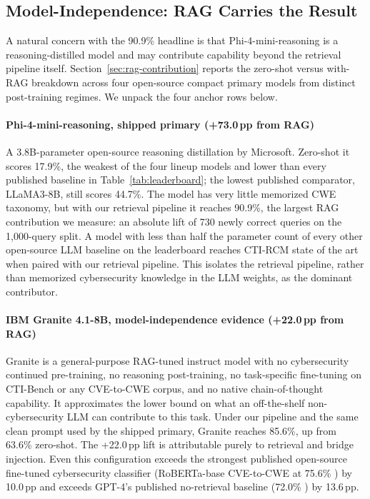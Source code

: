 \subsection{Model-Independence: RAG Carries the Result}
\label{sec:model-independence}

A natural concern with the 90.9\% headline is that Phi-4-mini-reasoning is a reasoning-distilled model and may contribute capability beyond the retrieval pipeline itself. Section~\ref{sec:rag-contribution} reports the zero-shot versus with-RAG breakdown across four open-source compact primary models from distinct post-training regimes. We unpack the four anchor rows below.

\paragraph{Phi-4-mini-reasoning, shipped primary (+73.0\,pp from RAG)} A 3.8B-parameter open-source reasoning distillation by Microsoft. Zero-shot it scores 17.9\%, the weakest of the four lineup models and lower than every published baseline in Table~\ref{tab:leaderboard}; the lowest published comparator, LLaMA3-8B, still scores 44.7\%. The model has very little memorized CWE taxonomy, but with our retrieval pipeline it reaches 90.9\%, the largest RAG contribution we measure: an absolute lift of 730 newly correct queries on the 1{,}000-query split. A model with less than half the parameter count of every other open-source LLM baseline on the leaderboard reaches CTI-RCM state of the art when paired with our retrieval pipeline. This isolates the retrieval pipeline, rather than memorized cybersecurity knowledge in the LLM weights, as the dominant contributor.

\paragraph{IBM Granite 4.1-8B, model-independence evidence (+22.0\,pp from RAG)} Granite is a general-purpose RAG-tuned instruct model \cite{ibm-granite-2026} with no cybersecurity continued pre-training, no reasoning post-training, no task-specific fine-tuning on CTI-Bench or any CVE-to-CWE corpus, and no native chain-of-thought capability. It approximates the lower bound on what an off-the-shelf non-cybersecurity LLM can contribute to this task. Under our pipeline and the same clean prompt used by the shipped primary, Granite reaches 85.6\%, up from 63.6\% zero-shot. The +22.0\,pp lift is attributable purely to retrieval and bridge injection. Even this configuration exceeds the strongest published open-source fine-tuned cybersecurity classifier (RoBERTa-base CVE-to-CWE at 75.6\% \cite{mosievskiy-2026}) by 10.0\,pp and exceeds GPT-4's published no-retrieval baseline (72.0\% \cite{alam-2024}) by 13.6\,pp.

